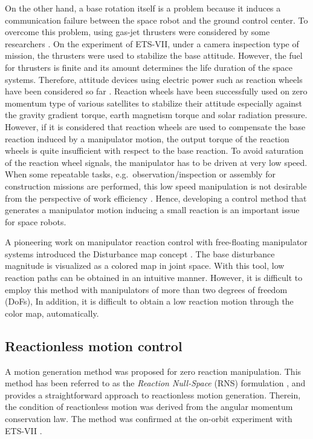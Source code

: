 On the other hand,
a base rotation itself is a problem because it induces a communication failure between
the space robot and the ground control center.
To overcome this problem,
using gas-jet thrusters were considered by some researchers \cite{Dubowsky1991}.
On the experiment of ETS-VII,
under a camera inspection type of mission,
the thrusters were used to stabilize the base attitude.
However, the fuel for thrusters is finite and its amount determines the life duration of the space systems.
Therefore, attitude devices using electric power such as reaction wheels have been considered so far \cite{Yoshida1994,Aghili2009}.
Reaction wheels have been successfully used on zero momentum type of various satellites
to stabilize their attitude especially against the gravity gradient torque, earth magnetism torque and
solar radiation pressure.
However, if it is considered that reaction wheels are used to compensate
the base reaction induced by a manipulator motion,
the output torque of the reaction wheels is quite insufficient with respect to the base reaction.
To avoid saturation of the reaction wheel signals,
the manipulator has to be driven at very low speed.
When some repeatable tasks, e.g.\ observation/inspection or assembly for construction missions
are performed, this low speed manipulation is
not desirable from the perspective of work efficiency \cite{Umetani1989}.
Hence, developing a control method that generates a manipulator motion inducing a small reaction
is an important issue for space robots.

A pioneering work on manipulator reaction control with free-floating manipulator systems
introduced the Disturbance map concept \cite{Dubowsky1991,Dubowsky1993}.
The base disturbance magnitude is visualized as a colored map in joint space.
With this tool, low reaction paths can be obtained in an intuitive manner.
However, it is difficult to employ this method with manipulators of more than two degrees of 
freedom (DoFs), 
In addition,
it is difficult to obtain a low reaction motion through the color map, automatically.

\subsection{Reactionless motion control}
A motion generation method was proposed for zero reaction manipulation.
This method has been referred to as the \textit{Reaction Null-Space} (RNS)
formulation \cite{Nenchev1990, Nenchev1999b, Nenchev1999a},
and provides a straightforward approach to reactionless motion generation.
Therein, the condition of reactionless motion was derived from the angular momentum conservation law.
The method was confirmed at the on-orbit experiment with ETS-VII \cite{Yoshida2001}.

